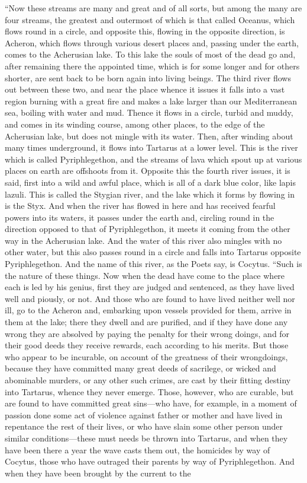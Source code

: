 \documentclass[letterpaper,12pt]{article}
\newcommand{\stephpag}[1]{\marginnote{\small\itshape\fontfamily{ppl}\selectfont #1}}
\begin{document}
\begin{drama}
``Now these streams are many and great and of all sorts, but among the many are four streams, the greatest and outermost of which is that called Oceanus, which flows round in a circle, and opposite this, flowing in the opposite direction, is Acheron, which flows through \stephpag{113 a} various desert places and, passing under the earth, comes to the Acherusian lake. To this lake the souls of most of the dead go and, after remaining there the appointed time, which is for some longer and for others shorter, are sent back to be born again into living beings. The third river flows out between these two, and near the place whence it issues it falls into a vast region burning with a great fire and makes a lake larger than our Mediterranean sea, boiling with water and mud. \stephpag{b} Thence it flows in a circle, turbid and muddy, and comes in its winding course, among other places, to the edge of the Acherusian lake, but does not mingle with its water. Then, after winding about many times underground, it flows into Tartarus at a lower level. This is the river which is called Pyriphlegethon, and the streams of lava which spout up at various places on earth are offshoots from it. Opposite this the fourth river issues, it is said, first into a wild and awful place, which is all of a dark blue color, like lapis lazuli. \stephpag{c} This is called the Stygian river, and the lake which it forms by flowing in is the Styx. And when the river has flowed in here and has received fearful powers into its waters, it passes under the earth and, circling round in the direction opposed to that of Pyriphlegethon, it meets it coming from the other way in the Acherusian lake. And the water of this river also mingles with no other water, but this also passes round in a circle and falls into Tartarus opposite Pyriphlegethon. And the name of this river, as the Poets say, is Cocytus. \stephpag{d} ``Such is the nature of these things. Now when the dead have come to the place where each is led by his genius, first they are judged and sentenced, as they have lived well and piously, or not. And those who are found to have lived neither well nor ill, go to the Acheron and, embarking upon vessels provided for them, arrive in them at the lake; there they dwell and are purified, and if they have done any wrong they are absolved by paying the penalty for their wrong doings, \stephpag{e} and for their good deeds they receive rewards, each according to his merits. But those who appear to be incurable, on account of the greatness of their wrongdoings, because they have committed many great deeds of sacrilege, or wicked and abominable murders, or any other such crimes, are cast by their fitting destiny into Tartarus, whence they never emerge. Those, however, who are curable, but are found to have committed great sins---who have, for example, in a moment of passion done some act of violence against father or mother and \stephpag{114 a} have lived in repentance the rest of their lives, or who have slain some other person under similar conditions---these must needs be thrown into Tartarus, and when they have been there a year the wave casts them out, the homicides by way of Cocytus, those who have outraged their parents by way of Pyriphlegethon. And when they have been brought by the current to the 
\end{drama}
\end{document}

